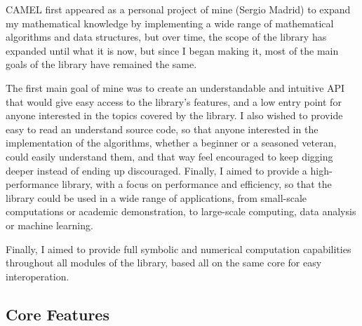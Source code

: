 \documentclass[a4paper,oneside,10pt]{article}
\theoremstyle{definition}
\begin{document}
CAMEL first appeared as a personal project of mine (Sergio Madrid) to expand my mathematical knowledge by implementing a wide range of mathematical algorithms and data structures, but over time, the scope of the library has expanded until what it is now, but since I began making it, most of the main goals of the library have remained the same.

The first main goal of mine was to create an understandable and intuitive API that would give easy access to the library's features, and a low entry point for anyone interested in the topics covered by the library. I also wished to provide easy to read an understand source code, so that anyone interested in the implementation of the algorithms, whether a beginner or a seasoned veteran, could easily understand them, and that way feel encouraged to keep digging deeper instead of ending up discouraged. Finally, I aimed to provide a high-performance library, with a focus on performance and efficiency, so that the library could be used in a wide range of applications, from small-scale computations or academic demonstration, to large-scale computing, data analysis or machine learning.

Finally, I aimed to provide full symbolic and numerical computation capabilities throughout all modules of the library, based all on the same core for easy interoperation.

\subsection{Core Features}
\end{document}
